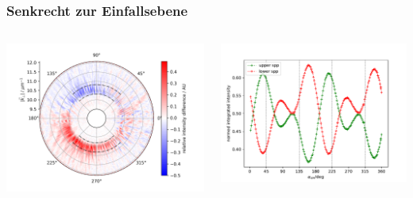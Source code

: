 \documentclass[aspectratio=1610]{beamer}
\begin{document}
			\begin{frame}
				\frametitle{Senkrecht zur Einfallsebene}
				\begin{columns}
					\begin{column}{0.5\textwidth}
						\includegraphics[width=\textwidth]{figures/spin_hall/diff_mid.png}
					\end{column}
					\begin{column}{0.5\textwidth}  %
						\includegraphics[width=\textwidth]{figures/spin_hall/intensity_mid.pdf}
					\end{column}
				\end{columns}
			\end{frame}
		
	
		
	
	

	
\end{document}

